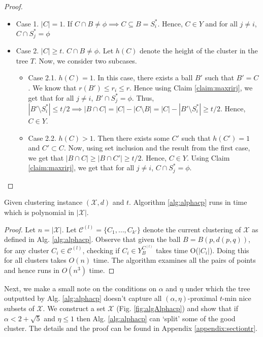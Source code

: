 \documentclass[anon,12pt]{colt2016} %
\newcommand{\mc}{\mathcal}
\begin{document}
\begin{proof}
\begin{itemize}[nolistsep]
\item Case 1. $|C| = 1$. If $C \cap B \neq \phi \implies C \subseteq B = S_i^*$. Hence, $C \in Y$ and for all $j \neq i$, $C \cap S_j^* = \phi$

\item Case 2. $|C|\ge t$. $C \cap B \neq \phi$. Let $h(C)$ denote the height of the cluster in the tree $T$. Now, we consider two subcases.
\begin{itemize}
\renewcommand\labelitemii{$\circ$}
\item Case 2.1. $h(C) = 1$. In this case, there exists a ball $B'$ such that $B' = C$. We know that $r(B') \le r_i \le r$. Hence using Claim \ref{claim:maxrirj}, we get that for all $j \neq i$, $B' \cap S_j^* = \phi$. Thus, $|B'\setminus S_i^*| \le t/2 \implies |B\cap C| = |C| - |C\setminus B| = |C| - |B'\setminus S_i^*| \ge t/2$. Hence, $C \in Y$.

\item Case 2.2. $h(C) > 1$. Then there exists some $C'$ such that $h(C') = 1$ and $C' \subset C$. Now, using set inclusion and the result from the first case, we get that $|B\cap C| \ge |B\cap C'| \ge t/2$. Hence, $C \in Y$. Using Claim \ref{claim:maxrirj}, we get that for all $j \neq i$, $C \cap S_j^* = \phi$.
\end{itemize} 
\end{itemize}
\end{proof}

\begin{theorem}
\label{thm:algcptime}
Given clustering instance $(\mc X, d)$ and $t$. Algorithm \ref{alg:alphacp} runs in time which is polynomial in $|\mc X|$.
\end{theorem}

\begin{proof}
Let $n = |\mc X|$. Let $\mc C^{(l)} =\{C_1, \ldots, C_{k'}\}$ denote the current clustering of $\mc X$ as defined in Alg. \ref{alg:alphacp}. Observe that given the ball $B = B(p, d(p, q))$, for any cluster $C_i \in \mc C^{(l)}$, checking if $C_i \in Y_B^{C^{(l)}}$ takes time O($|C_i|$). Doing this for all clusters takes $O(n)$ time. The algorithm examines all the pairs of points and hence runs in $O(n^3)$ time.
\end{proof}

Next, we make a small note on the conditions on $\alpha$ and $\eta$ under which the tree outputted by Alg. \ref{alg:alphacp} doesn't capture all $(\alpha, \eta)$-proximal $t$-min nice subsets of $\mc X$. We construct a set $\mc X$ (Fig. \ref{fig:algAlphacp}) and show that if $\alpha < 2 + \sqrt{5}$ and $\eta \le 1$ then Alg. \ref{alg:alphacp} can `split' some of the good cluster. The details and the proof can be found in Appendix \ref{appendix:sectiontr}.
 
\end{document}
